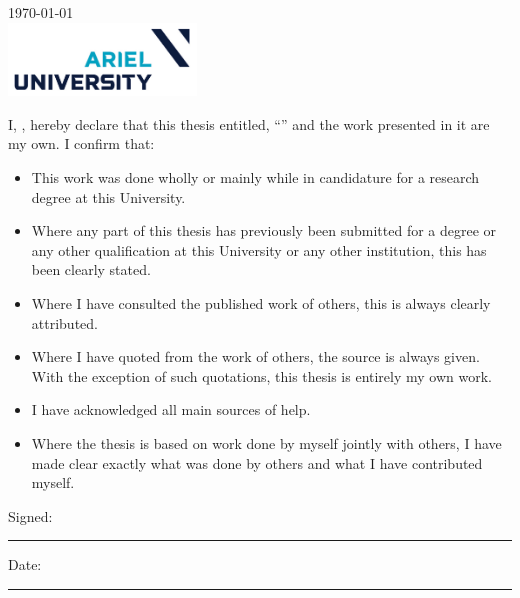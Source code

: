 \documentclass[
11pt, %
oneside, %
english, %
singlespacing, %
headsepline, %
]{MastersDoctoralThesis} %
\begin{document}
\begin{titlepage}
\begin{center}
\vfill

{\large \today}\\[4cm] %
\includegraphics[width=50mm]{Figures/Ariel1.png} %
 
\vfill
\end{center}
\end{titlepage}


\begin{declaration}
\addchaptertocentry{\authorshipname} %
\noindent I, \authorname, hereby declare that this thesis entitled, \enquote{\ttitle} and the work presented in it are my own. I confirm that:

\begin{itemize} 
\item This work was done wholly or mainly while in candidature for a research degree at this University.
\item Where any part of this thesis has previously been submitted for a degree or any other qualification at this University or any other institution, this has been clearly stated.
\item Where I have consulted the published work of others, this is always clearly attributed.
\item Where I have quoted from the work of others, the source is always given. With the exception of such quotations, this thesis is entirely my own work.
\item I have acknowledged all main sources of help.
\item Where the thesis is based on work done by myself jointly with others, I have made clear exactly what was done by others and what I have contributed myself.\\
\end{itemize}
 
\noindent Signed:\\
\rule[0.5em]{25em}{0.5pt} %
 
\noindent Date:\\
\rule[0.5em]{25em}{0.5pt} %
\end{declaration}
\end{document}
